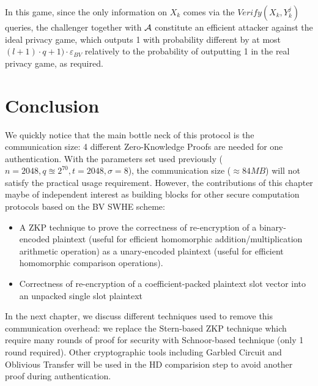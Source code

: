 In this game, since the only information on $X_k$ comes via the $Verify(X_k,Y_k^{j})$ queries, the challenger together with $\mathcal{A}$ constitute an efficient attacker against the ideal privacy game, which outputs 1 with probability different by at most $(l+1) \cdot q + 1) \cdot \varepsilon_{BV}$ relatively to the probability of outputting 1 in the real privacy game, as required.

\section{Conclusion}
\label{sec:evaluation}
We quickly notice that the main bottle neck of this protocol is the communication size: 4 different Zero-Knowledge Proofs are needed for one authentication. With the parameters set used previously ($n=2048, q \approxeq 2^{70}, t = 2048, \sigma=8$), the communication size ($\approx 84MB$) will not satisfy the practical usage requirement. However, the contributions of this chapter maybe of independent interest as building blocks for other secure computation protocols based on the BV SWHE scheme:
\begin{itemize}
\item A ZKP technique to prove the correctness of re-encryption of a binary-encoded plaintext (useful for efficient homomorphic addition/multiplication arithmetic operation) as a unary-encoded plaintext (useful for efficient homomorphic comparison operations).
\item Correctness of re-encryption of a coefficient-packed plaintext slot vector into an unpacked single slot plaintext
\end{itemize}
In the next chapter, we discuss different techniques used to remove this communication overhead: we replace the Stern-based ZKP technique which require many rounds of proof for security with Schnoor-based technique (only 1 round required). Other cryptographic tools including Garbled Circuit and Oblivious Transfer will be used in the HD comparision step to avoid another proof during authentication.



